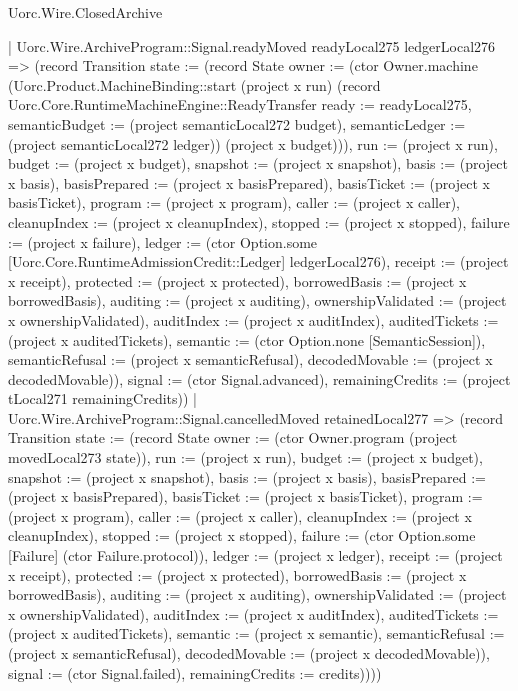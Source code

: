 \begin{lexlean}{Uorc.Wire.ClosedArchive}
\begin{semanticmodule}
{          | Uorc.Wire.ArchiveProgram::Signal.readyMoved readyLocal275 ledgerLocal276 => (record Transition {state := (record State {owner := (ctor Owner.machine (Uorc.Product.MachineBinding::start (project x run) (record Uorc.Core.RuntimeMachineEngine::ReadyTransfer {ready := readyLocal275, semanticBudget := (project semanticLocal272 budget), semanticLedger := (project semanticLocal272 ledger)}) (project x budget))), run := (project x run), budget := (project x budget), snapshot := (project x snapshot), basis := (project x basis), basisPrepared := (project x basisPrepared), basisTicket := (project x basisTicket), program := (project x program), caller := (project x caller), cleanupIndex := (project x cleanupIndex), stopped := (project x stopped), failure := (project x failure), ledger := (ctor Option.some [Uorc.Core.RuntimeAdmissionCredit::Ledger] ledgerLocal276), receipt := (project x receipt), protected := (project x protected), borrowedBasis := (project x borrowedBasis), auditing := (project x auditing), ownershipValidated := (project x ownershipValidated), auditIndex := (project x auditIndex), auditedTickets := (project x auditedTickets), semantic := (ctor Option.none [SemanticSession]), semanticRefusal := (project x semanticRefusal), decodedMovable := (project x decodedMovable)}), signal := (ctor Signal.advanced), remainingCredits := (project tLocal271 remainingCredits)})
          | Uorc.Wire.ArchiveProgram::Signal.cancelledMoved retainedLocal277 => (record Transition {state := (record State {owner := (ctor Owner.program (project movedLocal273 state)), run := (project x run), budget := (project x budget), snapshot := (project x snapshot), basis := (project x basis), basisPrepared := (project x basisPrepared), basisTicket := (project x basisTicket), program := (project x program), caller := (project x caller), cleanupIndex := (project x cleanupIndex), stopped := (project x stopped), failure := (ctor Option.some [Failure] (ctor Failure.protocol)), ledger := (project x ledger), receipt := (project x receipt), protected := (project x protected), borrowedBasis := (project x borrowedBasis), auditing := (project x auditing), ownershipValidated := (project x ownershipValidated), auditIndex := (project x auditIndex), auditedTickets := (project x auditedTickets), semantic := (project x semantic), semanticRefusal := (project x semanticRefusal), decodedMovable := (project x decodedMovable)}), signal := (ctor Signal.failed), remainingCredits := credits}))))
}
\end{semanticmodule}
\end{lexlean}
